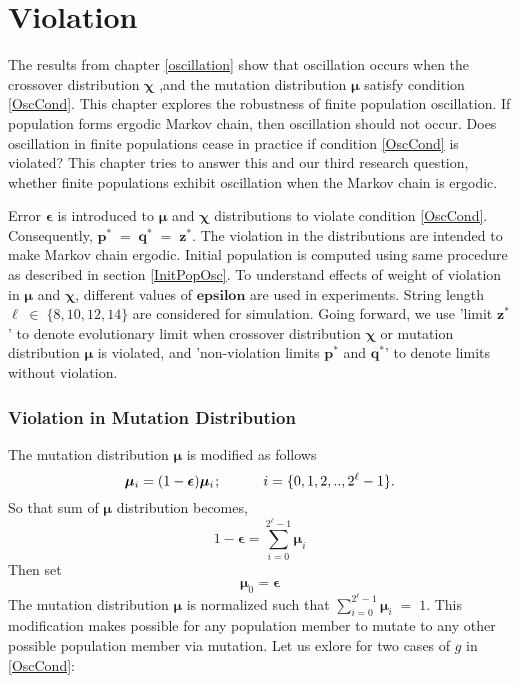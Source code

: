 \chapter{Violation} \label{ch:evolutionary limits}
The results from chapter \ref{oscillation} show that oscillation occurs
when the crossover distribution $\bm{\chi}$ ,and the mutation distribution $\bm{\mu}$ 
satisfy condition \ref{OscCond}. This chapter explores the robustness of finite population oscillation. 
If population forms ergodic Markov chain, then oscillation should not occur. Does oscillation 
in finite populations cease in practice if condition \ref{OscCond} is violated? 
This chapter tries to answer this and our  
third research question, whether finite populations exhibit oscillation when the Markov chain 
is ergodic.

Error $\bm{\epsilon}$ is introduced to $\bm{\mu}$ and $\bm{\chi}$ distributions to 
violate condition \ref{OscCond}. Consequently, $\bm{p}^\ast \;=\; \bm{q}^\ast \;=\; \bm{z}^\ast$. 
The violation in the distributions are intended to make Markov chain ergodic. Initial population is 
computed using same procedure as described in section \ref{InitPopOsc}. To understand effects of weight 
of violation in $\bm{\mu}$ and $\bm{\chi}$, different values of $\bm{epsilon}$ are used in experiments. 
String length $\ell \;\in\; \{8, 10, 12, 14\}$ are considered for simulation.
Going forward, we use 'limit $\bm{z}^\ast$' to denote evolutionary limit when crossover distribution 
$\bm{\chi}$ or mutation distribution $\bm{\mu}$ is violated, and 
'non-violation limits $\bm{p}^\ast$ and $\bm{q}^\ast$' to denote limits without violation.

\subsection{Violation in Mutation Distribution}
The mutation distribution $\bm{\mu}$ is modified as follows
\[
\bm{\mu}_i = (1-\bm{\epsilon}) \bm{\mu}_i \hspace{0.01in}; \hspace{30pt} i = \{0, 1, 2,.., 2^{\ell}-1\}.
\]
So that sum of $\bm{\mu}$ distribution becomes, 
\[
1-\bm{\epsilon} = \sum \limits_{i=0}^{2^{\ell}-1} \bm{\mu}_i
\]
Then set
\[
\bm{\mu}_0 = \bm{\epsilon}
\]
The mutation distribution $\bm{\mu}$ is normalized such that  $\sum\limits_{i=0}^{2^{\ell}-1}\bm{\mu}_i \;=\; 1$.
This modification makes possible for any population member to mutate to any other possible population member via mutation. 
Let us exlore for two cases of $g$ in \ref{OscCond}:

